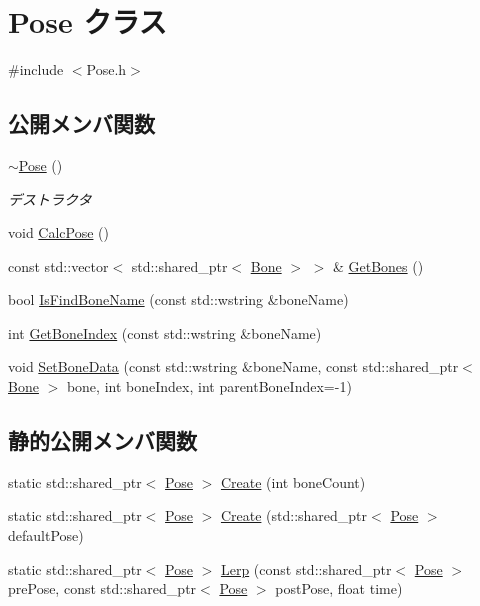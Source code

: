 \hypertarget{class_pose}{}\section{Pose クラス}
\label{class_pose}


{\ttfamily \#include $<$Pose.\+h$>$}

\subsection*{公開メンバ関数}
\begin{DoxyCompactItemize}
\item 
\mbox{\hyperlink{class_pose_a4267a4b362912dded8377f2c3260803e}{$\sim$\+Pose}} ()
\begin{DoxyCompactList}\small\item\em デストラクタ \end{DoxyCompactList}\item 
void \mbox{\hyperlink{class_pose_a95523df0d97161fcf06258fa3dd556c7}{Calc\+Pose}} ()
\item 
const std\+::vector$<$ std\+::shared\+\_\+ptr$<$ \mbox{\hyperlink{class_bone}{Bone}} $>$ $>$ \& \mbox{\hyperlink{class_pose_a3767b292c049a75e996431649e246cc2}{Get\+Bones}} ()
\item 
bool \mbox{\hyperlink{class_pose_ae35ff02e01aac542188ad0ed885badfd}{Is\+Find\+Bone\+Name}} (const std\+::wstring \&bone\+Name)
\item 
int \mbox{\hyperlink{class_pose_a068da60cad6259e02fdc047a454b0cde}{Get\+Bone\+Index}} (const std\+::wstring \&bone\+Name)
\item 
void \mbox{\hyperlink{class_pose_ae64673fd020b5d6bc17dcac4607de85f}{Set\+Bone\+Data}} (const std\+::wstring \&bone\+Name, const std\+::shared\+\_\+ptr$<$ \mbox{\hyperlink{class_bone}{Bone}} $>$ bone, int bone\+Index, int parent\+Bone\+Index=-\/1)
\end{DoxyCompactItemize}
\subsection*{静的公開メンバ関数}
\begin{DoxyCompactItemize}
\item 
static std\+::shared\+\_\+ptr$<$ \mbox{\hyperlink{class_pose}{Pose}} $>$ \mbox{\hyperlink{class_pose_a47091fb8b00829db53ec72d7f35a1cad}{Create}} (int bone\+Count)
\item 
static std\+::shared\+\_\+ptr$<$ \mbox{\hyperlink{class_pose}{Pose}} $>$ \mbox{\hyperlink{class_pose_a44d938544c9613f1753007fa2e419bdd}{Create}} (std\+::shared\+\_\+ptr$<$ \mbox{\hyperlink{class_pose}{Pose}} $>$ default\+Pose)
\item 
static std\+::shared\+\_\+ptr$<$ \mbox{\hyperlink{class_pose}{Pose}} $>$ \mbox{\hyperlink{class_pose_a250f6075206d81cde427646d72e75ec5}{Lerp}} (const std\+::shared\+\_\+ptr$<$ \mbox{\hyperlink{class_pose}{Pose}} $>$ pre\+Pose, const std\+::shared\+\_\+ptr$<$ \mbox{\hyperlink{class_pose}{Pose}} $>$ post\+Pose, float time)
\end{DoxyCompactItemize}


